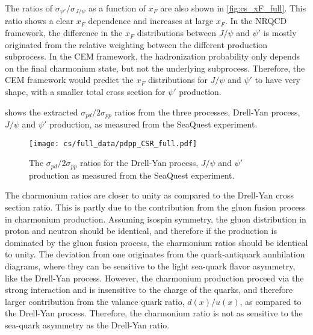\documentclass[../main.tex]{subfiles}
\begin{document}
The ratios of $\sigma_{\psi'}/\sigma_{J/\psi}$ as a function of $x_F$ are also shown in \cref{fig:cs_xF_full}.
This ratio shows a clear $x_F$ dependence and increases at large $x_F$. In the NRQCD framework,
the difference in the $x_F$ distributions between $J/\psi$ and $\psi'$ is mostly originated
from the relative weighting between the different production subprocess.
In the CEM framework, the hadronization probability only depends on
the final charmonium state, but not the underlying subprocess. Therefore, the CEM framework would predict
the $x_F$ distributions for $J/\psi$ and $\psi'$ to have very shape, with a smaller total cross section
for $\psi'$ production.

 shows the extracted $\sigma_{pd}/2\sigma_{pp}$ ratios from the three processes,
Drell-Yan process, $J/\psi$ and $\psi'$ production, as measured from the SeaQuest experiment.
\begin{figure}[h!]
	\centering
	\texttt{[image: cs/full\_data/pdpp\_CSR\_full.pdf]}
	\caption{The $\sigma_{pd}/2\sigma_{pp}$ ratios for the Drell-Yan process, $J/\psi$ and $\psi'$ production
		as measured from the SeaQuest experiment.
	}
	\label{fig:csr_all_process}
\end{figure}
The charmonium ratios are closer to unity as compared to the Drell-Yan cross section ratio. This 
is partly due to the contribution from the gluon fusion process in charmonium production. Assuming 
isospin symmetry, the gluon distribution in proton and neutron should be identical, and therefore
if the production is dominated by the gluon fusion process, the charmonium ratios should be identical
to unity. The deviation from one originates from the quark-antiquark annhilation diagrams, where they
can be sensitive to the light sea-quark flavor asymmetry, like the Drell-Yan process. However, the charmonium
production proceed via the strong interaction and is insensitive to the charge of the quarks, and therefore
larger contribution from the valance quark ratio, $d(x)/u(x)$, as compared to the Drell-Yan process. Therefore,
the charmonium ratio is not as sensitive to the sea-quark asymmetry as the Drell-Yan ratio.


\FloatBarrier
\end{document}
